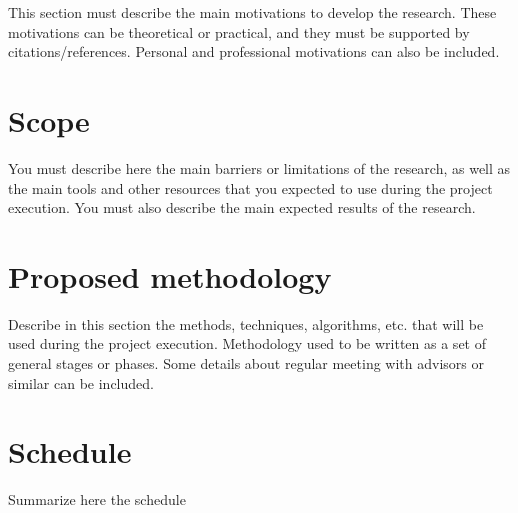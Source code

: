 \documentclass[11pt,letterpaper]{article}
\begin{document}
This section must describe the main motivations to develop the research. These motivations can be theoretical or practical, and they must be supported by citations/references. Personal and professional motivations can also be included.


\section{Scope}

You must describe here the main barriers or limitations of the research, as well as the main tools and other resources that you expected to use during the project execution. You must also describe the main expected results of the research.


\section{Proposed methodology}

Describe in this section the methods, techniques, algorithms, etc. that will be used during the project execution. Methodology used to be written as a set of general stages or phases. Some details about regular meeting with advisors or similar can be included.


\section{Schedule}

Summarize here the schedule
\end{document}
